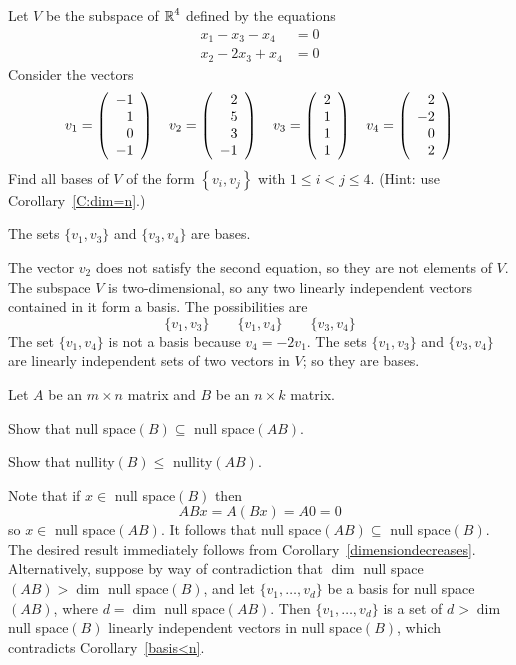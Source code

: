 \documentclass{ximera}
\begin{document}
\begin{exercise} \label{A5.6.1}
Let $V$ be the subspace of $\mbox{$\Bbb{R}$}^4$ defined by the equations
\begin{align*}
x_1-x_3-x_4&=0\\
x_2-2x_3+x_4&=0
\end{align*}
Consider the vectors
\[
v_1=\left(\begin{array}{rrrrrrrrrrrrrrrrrr} -1\\1\\0\\-1 \end{array}\right) \quad 
v_2=\left(\begin{array}{rrrrrrrrrrrrrrrrrr} 2\\5\\3\\-1 \end{array}\right) \quad  
v_3=\left(\begin{array}{rrrrrrrrrrrrrrrrrr} 2\\1\\1\\1 \end{array}\right) \quad  
v_4=\left(\begin{array}{rrrrrrrrrrrrrrrrrr} 2\\-2\\0\\2 \end{array}\right)
\]
Find all bases of $V$ of the form $\left\{v_i,v_j\right\}$ with $1\leq i< j\leq 4.$ (Hint: use Corollary~\ref{C:dim=n}.)

\begin{solution}
\ans The sets $\{v_1,v_3\}$ and $\{v_3,v_4\}$ are bases. 

\soln The vector $v_2$ does not satisfy the second equation, so they are not elements of $V$.  
The subspace $V$ is two-dimensional, so any two linearly independent vectors contained in it form a basis. 
The possibilities are 
\[
\{v_1,v_3\} \qquad  \{v_1,v_4\} \qquad \{v_3,v_4\}
\]
The set $\{v_1,v_4\}$ is not a basis because $v_4= -2v_1$. The sets $\{v_1,v_3\}$ and $\{v_3,v_4\}$ are 
linearly independent sets of two vectors in $V$; so they are bases. 
\end{solution}
\end{exercise}

\begin{exercise} \label{A5.6.2}
Let $A$ be an $m\times n$ matrix and $B$ be an $n\times k$ matrix. 
\begin{enumeratea}
\item Show that null space$(B) \subseteq$ null space$(AB)$.
\item Show that nullity$(B) \leq$ nullity$(AB)$.
\end{enumeratea}

\begin{solution}
\soln Note that if $x\in$ null space$(B)$ then 
\[
ABx=A(Bx)=A0=0
\]
so $x\in$ null space$(AB)$. It follows that null space$(AB)\subseteq$ null space$(B)$. The desired result immediately follows from Corollary~\ref{dimensiondecreases}. Alternatively, suppose by way of contradiction that $\dim$ null space$(AB)>\dim$ null space$(B)$, and let $\{v_1,\ldots,v_d\}$ be a basis for null space$(AB)$, where $d=\dim$ null space$(AB)$. Then $\{v_1,\ldots,v_d \}$ is a set of $d>\dim$ null space$(B)$ linearly independent vectors in null space$(B)$, which contradicts Corollary~\ref{basis<n}.
\end{solution}
\end{exercise}
\end{document}
